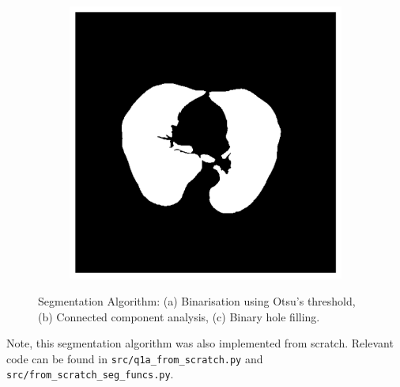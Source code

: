 \documentclass[11pt]{article}
\begin{document}
\begin{figure}[H]
\begin{subfigure}{.3\textwidth}
        \caption{}
        \label{fig:connected_components}
    \end{subfigure}%
    \begin{subfigure}{.3\textwidth}
        \centering
        \includegraphics[width=\linewidth]{figs/q1a_filled_holes.png}  %
        \caption{}
        \label{fig:filled_holes}
    \end{subfigure}
    \label{fig:segmentation_steps}
\caption{Segmentation Algorithm: (a) Binarisation using Otsu's threshold, (b) Connected component analysis, (c) Binary hole filling.}
\end{figure}

Note, this segmentation algorithm was also implemented from scratch. Relevant code can be found in \texttt{src/q1a\_from\_scratch.py} and \texttt{src/from\_scratch\_seg\_funcs.py}.
\end{document}
